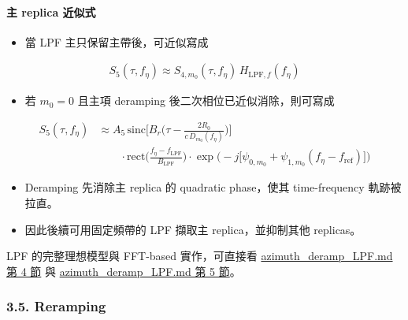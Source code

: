 \documentclass[10pt]{article}
\providecommand{\tightlist}{%
  \setlength{\itemsep}{0pt}\setlength{\parskip}{0pt}}
\begin{document}
\hypertarget{ux4e3b-replica-ux8fd1ux4f3cux5f0f}{%
\paragraph{主 replica 近似式}\label{ux4e3b-replica-ux8fd1ux4f3cux5f0f}}

\begin{itemize}
\tightlist
\item
  當 LPF 主只保留主帶後，可近似寫成
\end{itemize}

\begin{equation}
\begin{aligned}
S_5(\tau,f_\eta)\approx S_{4,m_0}(\tau,f_\eta)\,H_{\mathrm{LPF},f}(f_\eta)
\end{aligned}
\end{equation}

\begin{itemize}
\tightlist
\item
  若 \(m_0=0\) 且主項 deramping 後二次相位已近似消除，則可寫成
\end{itemize}

\begin{equation}
\begin{aligned}
S_5(\tau,f_\eta)
&\approx
A_5\,
\mathrm{sinc}\biggl[B_r\biggl(\tau-\frac{2R_0}{c\,D_{m_0}(f_\eta)}\biggr)\biggr]\\
&\qquad \cdot \mathrm{rect}\biggl(\frac{f_\eta-f_{\mathrm{LPF}}}{B_{\mathrm{LPF}}}\biggr)
\cdot \exp\biggl(-j\biggl[\psi_{0,m_0}+\psi_{1,m_0}(f_\eta-f_{\mathrm{ref}})\biggr]\biggr)
\end{aligned}
\end{equation}

\begin{itemize}
\tightlist
\item
  Deramping 先消除主 replica 的 quadratic phase，使其 time-frequency
  軌跡被拉直。
\item
  因此後續可用固定頻帶的 LPF 擷取主 replica，並抑制其他 replicas。
\end{itemize}

LPF 的完整理想模型與 FFT-based 實作，可直接看
\href{./azimuth_deramp_LPF.md\#4-ideal-lpf-model}{azimuth\_deramp\_LPF.md 第 4 節}
與
\href{./azimuth_deramp_LPF.md\#5-fft-based-lpf-implementation}{azimuth\_deramp\_LPF.md 第 5 節}。

\hypertarget{reramping}{%
\subsubsection{3.5. Reramping}\label{reramping}}
\end{document}
